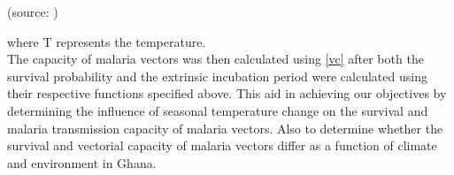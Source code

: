 \begin{center}
	(source: \citep{detinova1962age}) 
\end{center}


\noindent where T represents the temperature. \\

 
\noindent The capacity of malaria vectors was then calculated using \ref{vc} after both the survival probability and the extrinsic incubation period were calculated using their respective functions specified above. This aid in achieving our objectives by determining the influence of seasonal  temperature  change on the survival and malaria transmission capacity of malaria vectors. Also to determine whether  the survival and vectorial capacity of malaria vectors differ as a function of climate and environment in Ghana.







